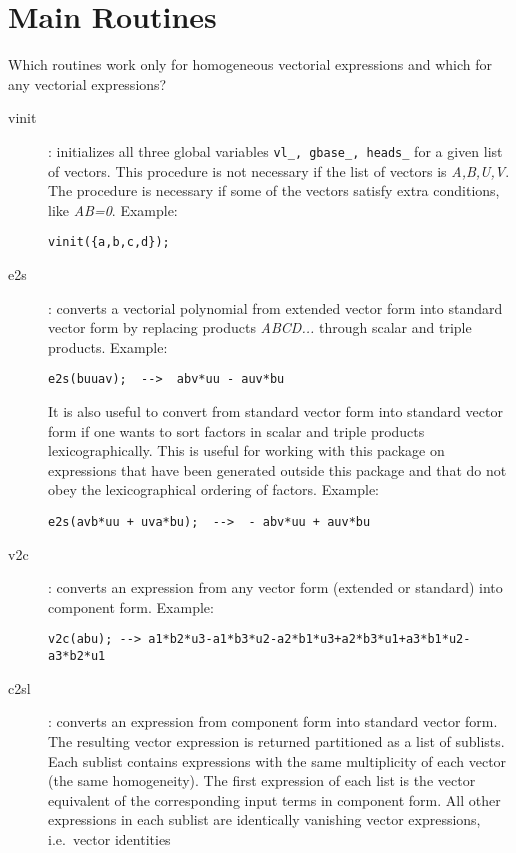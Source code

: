 \documentclass[12pt]{article}
\begin{document}
\section{Main Routines}
Which routines work only for homogeneous vectorial expressions and
which for any vectorial expressions?
\begin{description}
  \item[vinit] :
        initializes all three global variables {\tt vl\_, gbase\_, heads\_}
        for a given list of vectors. This procedure is not necessary if the
        list of vectors is {\it A,B,U,V}. The procedure is necessary if some
        of the vectors satisfy extra conditions, like {\it AB=0}.
        Example: \begin{verbatim}
vinit({a,b,c,d}); \end{verbatim}
  \item[e2s] :
        converts a vectorial polynomial from extended vector form into standard
        vector form by replacing products {\it ABCD...} through scalar
        and triple products. Example: \begin{verbatim}
e2s(buuav);  -->  abv*uu - auv*bu \end{verbatim}
        It is also useful to convert from
        standard vector form into standard vector form if one wants
        to sort factors in scalar and triple products lexicographically.
        This is useful for working with this package on expressions
        that have been generated outside this package and that do not obey
        the lexicographical ordering of factors.
        Example: \begin{verbatim}
e2s(avb*uu + uva*bu);  -->  - abv*uu + auv*bu \end{verbatim}
  \item[v2c] : converts an expression from any vector form (extended or
        standard) into component form. Example: \begin{verbatim}
v2c(abu); --> a1*b2*u3-a1*b3*u2-a2*b1*u3+a2*b3*u1+a3*b1*u2-a3*b2*u1\end{verbatim}
  \item[c2sl] : converts an expression from component form into
  standard vector form. The resulting vector expression is returned
  partitioned as a list of sublists. Each sublist contains expressions
  with the same multiplicity of each vector (the same homogeneity).
  The first expression of
  each list is the vector equivalent of the corresponding input terms
  in component form. All other expressions in each sublist are
  identically vanishing vector expressions, i.e.\ vector identities

\end{description}
\end{document}
